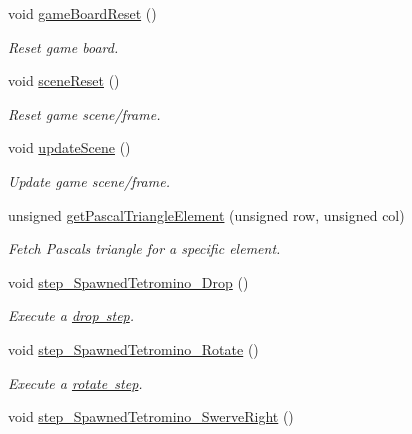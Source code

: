 \begin{DoxyCompactItemize}
\item 
void \mbox{\hyperlink{classTetreesEngine_ad28ed83be446f74c87d55d79cc64e6ef}{game\+Board\+Reset}} ()
\begin{DoxyCompactList}\small\item\em Reset game board. \end{DoxyCompactList}\item 
void \mbox{\hyperlink{classTetreesEngine_acb719449a68465839ebb0a5e7724cc34}{scene\+Reset}} ()
\begin{DoxyCompactList}\small\item\em Reset game scene/frame. \end{DoxyCompactList}\item 
void \mbox{\hyperlink{classTetreesEngine_a9aa3eec9561623f77eab13298ddad13c}{update\+Scene}} ()
\begin{DoxyCompactList}\small\item\em Update game scene/frame. \end{DoxyCompactList}\item 
unsigned \mbox{\hyperlink{classTetreesEngine_a087f12761b955478bff1d4e70e6c0549}{get\+Pascal\+Triangle\+Element}} (unsigned row, unsigned col)
\begin{DoxyCompactList}\small\item\em Fetch Pascal\textquotesingle{}s triangle for a specific element. \end{DoxyCompactList}\item 
void \mbox{\hyperlink{classTetreesEngine_a626d60fa8adb2dd024016b5cfed4f6ee}{step\+\_\+\+Spawned\+Tetromino\+\_\+\+Drop}} ()
\begin{DoxyCompactList}\small\item\em Execute a \mbox{\hyperlink{TetreesDefs_8hpp_a4d5a793092a473f85b4c1f7faf62afeda6df5f4c213c30a4ad91af7a5d10daa8e}{drop step}}. \end{DoxyCompactList}\item 
void \mbox{\hyperlink{classTetreesEngine_a90d1d65e12fb37850962305d8bc3b7a3}{step\+\_\+\+Spawned\+Tetromino\+\_\+\+Rotate}} ()
\begin{DoxyCompactList}\small\item\em Execute a \mbox{\hyperlink{TetreesDefs_8hpp_a4d5a793092a473f85b4c1f7faf62afeda22387bf41fe41a5ac2b7b74ab8f5c342}{rotate step}}. \end{DoxyCompactList}\item 
void \mbox{\hyperlink{classTetreesEngine_a46e1950877c8b8aa7e988ca3de14ad18}{step\+\_\+\+Spawned\+Tetromino\+\_\+\+Swerve\+Right}} ()

\end{DoxyCompactItemize}
